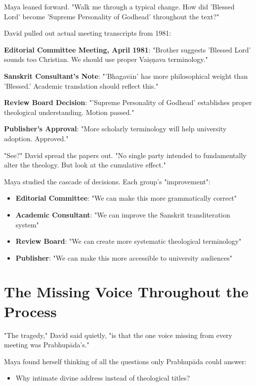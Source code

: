 \documentclass[11pt,twoside]{book}
\begin{document}
Maya leaned forward. "Walk me through a typical change. How did 'Blessed Lord' become 'Supreme Personality of Godhead' throughout the text?"

David pulled out actual meeting transcripts from 1981:

\textbf{\textbf{Editorial Committee Meeting, April 1981}}: "Brother suggests 'Blessed Lord' sounds too Christian. We should use proper Vaiṣṇava terminology."

\textbf{\textbf{Sanskrit Consultant's Note}}: "'Bhagavān' has more philosophical weight than 'Blessed.' Academic translation should reflect this."

\textbf{\textbf{Review Board Decision}}: "'Supreme Personality of Godhead' establishes proper theological understanding. Motion passed."

\textbf{\textbf{Publisher's Approval}}: "More scholarly terminology will help university adoption. Approved."

"See?" David spread the papers out. "No single party intended to fundamentally alter the theology. But look at the cumulative effect."

Maya studied the cascade of decisions. Each group's "improvement":
\begin{itemize}
\item \textbf{\textbf{Editorial Committee}}: "We can make this more grammatically correct"
\item \textbf{\textbf{Academic Consultant}}: "We can improve the Sanskrit transliteration system"
\item \textbf{\textbf{Review Board}}: "We can create more systematic theological terminology"
\item \textbf{\textbf{Publisher}}: "We can make this more accessible to university audiences"
\end{itemize}
\section*{The Missing Voice Throughout the Process}
\label{sec:org12dca8b}

"The tragedy," David said quietly, "is that the one voice missing from every meeting was Prabhupāda's."

Maya found herself thinking of all the questions only Prabhupāda could answer:

\begin{itemize}
\item Why intimate divine address instead of theological titles?
\end{itemize}
\end{document}
